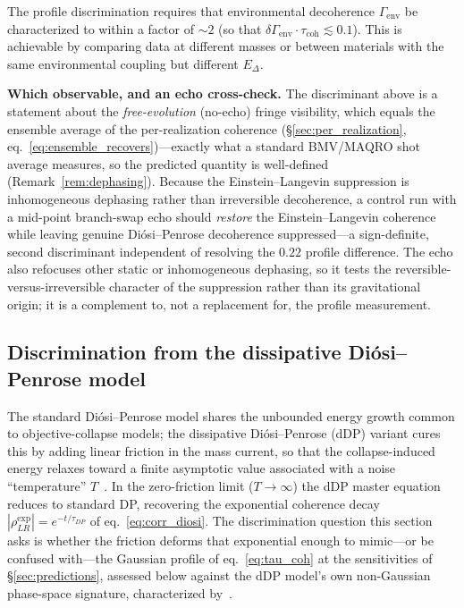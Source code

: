 \documentclass[12pt,a4paper]{article}
\theoremstyle{remark}
\begin{document}
The profile discrimination requires that environmental decoherence $\Gamma_{\text{env}}$
be characterized to within a factor of $\sim 2$ (so that $\delta\Gamma_{\text{env}}\cdot
\tau_{\text{coh}} \lesssim 0.1$). This is achievable by comparing data at different masses
or between materials with the same environmental coupling but different $E_\Delta$.

\textbf{Which observable, and an echo cross-check.} The discriminant above is a statement
about the \emph{free-evolution} (no-echo) fringe visibility, which equals the ensemble
average of the per-realization coherence
(\S\ref{sec:per_realization}, eq.~\eqref{eq:ensemble_recovers})---exactly what a standard
BMV/MAQRO shot average measures, so the predicted quantity is well-defined
(Remark~\ref{rem:dephasing}). Because the Einstein--Langevin suppression is inhomogeneous
dephasing rather than irreversible decoherence, a control run with a mid-point branch-swap
echo should \emph{restore} the Einstein--Langevin coherence while leaving genuine
Di\'osi--Penrose decoherence suppressed---a sign-definite, second discriminant independent
of resolving the $0.22$ profile difference. The echo also refocuses other static or
inhomogeneous dephasing, so it tests the reversible-versus-irreversible character of the
suppression rather than its gravitational origin; it is a complement to, not a replacement
for, the profile measurement.

\subsection{Discrimination from the dissipative Di\'osi--Penrose model}
\label{sec:ddp}

The standard Di\'osi--Penrose model shares the unbounded energy growth common to
objective-collapse models; the dissipative Di\'osi--Penrose (dDP) variant cures this by
adding linear friction in the mass current, so that the collapse-induced energy relaxes
toward a finite asymptotic value associated with a noise ``temperature''
$T$~\cite{ddp_model}. In the zero-friction limit ($T\to\infty$) the dDP master equation
reduces to standard DP, recovering the exponential coherence decay
$|\rho_{LR}^{\text{exp}}| = e^{-t/\tau_{DP}}$ of eq.~\eqref{eq:corr_diosi}. The
discrimination question this section asks is whether the friction deforms
that exponential enough to mimic---or be confused with---the Gaussian profile of
eq.~\eqref{eq:tau_coh} at the sensitivities of \S\ref{sec:predictions}, assessed below
against the dDP model's own non-Gaussian phase-space signature, characterized
by~\cite{melo_dissipative}.
\end{document}

